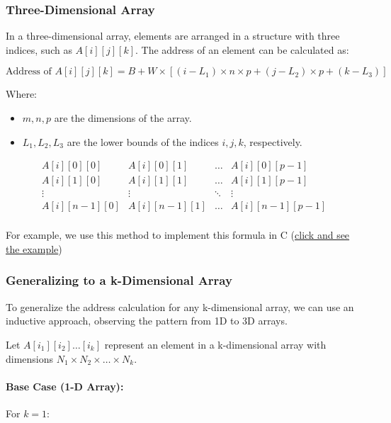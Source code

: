 \documentclass[12pt, oneside]{book}
\begin{document}
\subsubsection{Three-Dimensional Array}

In a three-dimensional array, elements are arranged in a structure with three indices, such as \( A[i][j][k] \). The address of an element can be calculated as:

\[
\text{Address of } A[i][j][k] = B + W \times \left[ (i - L_1) \times n \times p + (j - L_2) \times p + (k - L_3) \right]
\]

Where:
\begin{itemize}
	\item \( m, n, p \) are the dimensions of the array.
	\item \( L_1, L_2, L_3 \) are the lower bounds of the indices \( i, j, k \), respectively.
\end{itemize}

\[
\begin{array}{c|c|c|c}
	A[i][0][0] & A[i][0][1] & \dots & A[i][0][p-1] \\
	\hline
	A[i][1][0] & A[i][1][1] & \dots & A[i][1][p-1] \\
	\hline
	\vdots & \vdots & \ddots & \vdots \\
	\hline
	A[i][n-1][0] & A[i][n-1][1] & \dots & A[i][n-1][p-1] \\
\end{array}
\]

For example, we use this method to implement this formula in C (\href{https://github.com/m-mdy-m/Arliz/blob/main/AddressCalculation/Three-Dimensional.c}{click and see the example})

\subsubsection{Generalizing to a k-Dimensional Array}

To generalize the address calculation for any k-dimensional array, we can use an inductive approach, observing the pattern from 1D to 3D arrays.

Let \( A[i_1][i_2] \dots [i_k] \) represent an element in a k-dimensional array with dimensions \( N_1 \times N_2 \times \dots \times N_k \).

\paragraph{Base Case (1-D Array):}
For \( k = 1 \):
\end{document}
